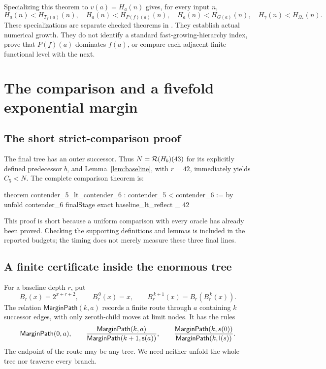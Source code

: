 Specializing this theorem to \(v(a)=H_a(n)\) gives, for every input \(n\),
\[
 H_a(n)<H_{T_f(a)}(n),\quad H_a(n)<H_{P(f)(a)}(n),\quad
 H_a(n)<H_{G(a)}(n),\quad H_\gamma(n)<H_{\Omega_*}(n).
\]
These specializations are separate checked theorems in
. They establish actual numerical growth.
They do not identify a standard fast-growing-hierarchy index, prove
that \(P(f)(a)\) dominates \(f(a)\), or compare each adjacent finite
functional level with the next.

\section{The comparison and a fivefold exponential margin}\label{sec:comparison}
\subsection{The short strict-comparison proof}
The final tree has an outer successor. Thus \(N=\mathcal R(H_b)(43)\)
for its explicitly defined predecessor \(b\), and
Lemma~\ref{lem:baseline}, with \(r=42\), immediately yields \(C_5<N\).
The complete comparison theorem is:
\begin{LeanCode}
theorem contender_5_lt_contender_6 :
    contender_5 < contender_6 := by
  unfold contender_6 finalStage
  exact baseline_lt_reflect _ 42
\end{LeanCode}
This proof is short because a uniform comparison with every oracle has
already been proved. Checking the supporting definitions and lemmas is
included in the reported budgets; the timing does not merely measure these
three final lines.

\subsection{A finite certificate inside the enormous tree}
For a baseline depth \(r\), put
\[
 B_r(x)=2^{x+r+2},\qquad B_r^{\,0}(x)=x,\qquad
 B_r^{\,k+1}(x)=B_r(B_r^{\,k}(x)).
\]
The relation \(\mathsf{MarginPath}(k,a)\) records a finite route through
\(a\) containing \(k\) successor edges, with only zeroth-child moves
at limit nodes. It has the rules
\[
 \mathsf{MarginPath}(0,a),
 \qquad
 \frac{\mathsf{MarginPath}(k,a)}
      {\mathsf{MarginPath}(k+1,\mathsf s(a))},
 \qquad
 \frac{\mathsf{MarginPath}(k,s(0))}
      {\mathsf{MarginPath}(k,\mathsf l(s))}.
\]
The endpoint of the route may be any tree. We need neither unfold the
whole tree nor traverse every branch.

